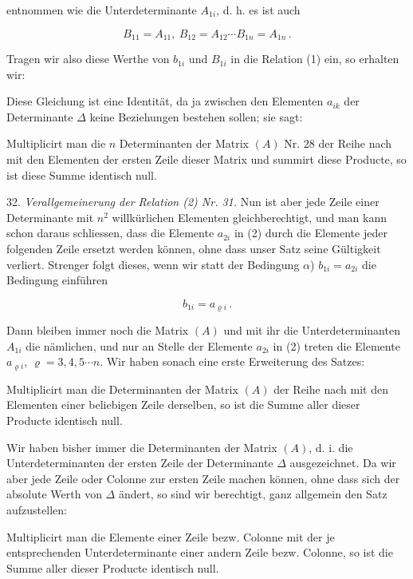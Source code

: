 entnommen wie die Unterdeterminante $A_{1i}$, d. h. es ist auch

\[
B_{11}=A_{11},\ B_{12}=A_{12}\cdots B_{1n}=A_{1n}\, .
\]

Tragen wir also diese Werthe von $b_{1i}$ und $B_{1i}$ in die Relation (1)
ein, so erhalten wir:


Diese Gleichung ist eine Identität, da ja zwischen den Elementen $a_{ik}$
der Determinante $\Delta$ keine Beziehungen bestehen sollen; sie sagt:

\glqq Multiplicirt man die $n$ Determinanten der Matrix $(A)$ Nr. 28 der
Reihe nach mit den Elementen der ersten Zeile dieser Matrix und summirt
diese Producte, so ist diese Summe identisch null.\grqq{}

32. \textit{Verallgemeinerung der Relation (2) Nr. 31.} Nun ist aber jede
Zeile einer Determinante mit $n^2$ willkürlichen Elementen
gleichberechtigt, und man kann schon daraus schliessen, dass die Elemente
$a_{2i}$ in (2) durch die Elemente jeder folgenden Zeile ersetzt werden
können, ohne dass unser Satz seine Gültigkeit verliert. Strenger folgt
dieses, wenn wir statt der Bedingung $\alpha$) $b_{1i}=a_{2i}$ die
Bedingung einführen

\[
b_{1i}=a_{\varrho i}\, .
\]

Dann bleiben immer noch die Matrix $(A)$ und mit ihr die
Unterdeterminanten $A_{1i}$ die nämlichen, und nur an Stelle der Elemente
$a_{2i}$ in (2) treten die Elemente $a_{\varrho i}$, $\varrho=3,4,5\cdots
n$. Wir haben sonach eine erste Erweiterung des Satzes:

\glqq Multiplicirt man die Determinanten der Matrix $(A)$ der Reihe nach
mit den Elementen einer beliebigen Zeile derselben, so ist die Summe
aller dieser Producte identisch null.\grqq{}


Wir haben bisher immer die Determinanten der Matrix $(A)$, d. i. die
Unterdeterminanten der ersten Zeile der Determinante $\Delta$
ausgezeichnet. Da wir aber jede Zeile oder Colonne zur ersten Zeile
machen können, ohne dass sich der absolute Werth von $\Delta$ ändert, so
sind wir berechtigt, ganz allgemein den Satz aufzustellen:

\glqq Multiplicirt man die Elemente einer Zeile bezw. Colonne mit der je
entsprechenden Unterdeterminante einer andern Zeile bezw. Colonne, so ist
die Summe aller dieser Producte identisch null.\grqq{}

